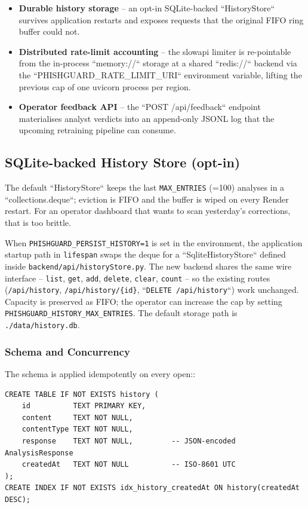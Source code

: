 \begin{itemize}
\item
  \textbf{Durable history storage} -- an opt-in SQLite-backed ``HistoryStore`` survives application restarts and exposes requests that the original FIFO ring buffer could not.
\item
  \textbf{Distributed rate-limit accounting} -- the slowapi limiter is re-pointable from the in-process ``memory://`` storage at a shared ``redis://`` backend via the ``PHISHGUARD\_RATE\_LIMIT\_URI`` environment variable, lifting the previous cap of one uvicorn process per region.
\item
  \textbf{Operator feedback API} -- the ``POST /api/feedback`` endpoint materialises analyst verdicts into an append-only JSONL log that the upcoming retraining pipeline can consume.
\end{itemize}

\subsection{SQLite-backed History Store (opt-in)}

The default ``HistoryStore`` keeps the last \texttt{MAX\_ENTRIES} (=100) analyses in a ``collections.deque``; eviction is FIFO and the buffer is wiped on every Render restart. For an operator dashboard that wants to scan yesterday's corrections, that is too brittle.

When \texttt{PHISHGUARD\_PERSIST\_HISTORY=1} is set in the environment, the application startup path in \texttt{lifespan} swaps the deque for a ``SqliteHistoryStore`` defined inside \texttt{backend/api/historyStore.py}. The new backend shares the same wire interface -- \texttt{list}, \texttt{get}, \texttt{add}, \texttt{delete}, \texttt{clear}, \texttt{count} -- so the existing routes (\texttt{/api/history}, \texttt{/api/history/\{id\}}, ``\texttt{DELETE /api/history}``) work unchanged. Capacity is preserved as FIFO; the operator can increase the cap by setting \texttt{PHISHGUARD\_HISTORY\_MAX\_ENTRIES}. The default storage path is \texttt{./data/history.db}.

\subsubsection{Schema and Concurrency}

The schema is applied idempotently on every open::

\begin{verbatim}
CREATE TABLE IF NOT EXISTS history (
    id          TEXT PRIMARY KEY,
    content     TEXT NOT NULL,
    contentType TEXT NOT NULL,
    response    TEXT NOT NULL,         -- JSON-encoded AnalysisResponse
    createdAt   TEXT NOT NULL          -- ISO-8601 UTC
);
CREATE INDEX IF NOT EXISTS idx_history_createdAt ON history(createdAt DESC);
\end{verbatim}

